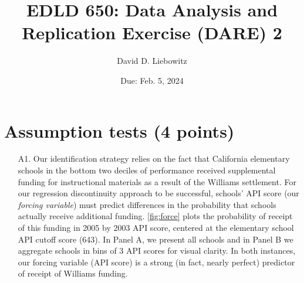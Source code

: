 \documentclass[a4paper, 11pt]{article}
\title{EDLD 650: Data Analysis and Replication Exercise (DARE) 2}
\author{David D. Liebowitz}
\date{Due: Feb. 5, 2024}
\begin{document}
\maketitle



\section{Assumption tests (4 points)}

\begin{enumerate}
	\item[A1.] Our identification strategy relies on the fact that California elementary schools in the bottom two deciles of performance received supplemental funding for instructional materials as a result of the Williams settlement. For our regression discontinuity approach to be successful, schools' API score (our \textit{forcing variable}) must predict differences in the probability that schools actually receive additional funding. \autoref{fig:force} plots the probability of receipt of this funding in 2005 by 2003 API score, centered at the elementary school API cutoff score (643). In Panel A, we present all schools and in Panel B we aggregate schools in bins of 3 API scores for visual clarity. In both instances, our forcing variable (API score) is a strong (in fact, nearly perfect) predictor of receipt of Williams funding. 


\end{enumerate}
\end{document}
